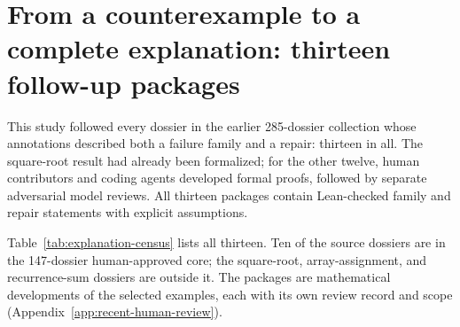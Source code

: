 \section{From a counterexample to a complete explanation: thirteen follow-up packages}
\label{app:explanation-census}

This study followed every dossier in the earlier 285-dossier collection whose annotations described both a failure family and a repair: thirteen in all. The square-root result had already been formalized; for the other twelve, human contributors and coding agents developed formal proofs, followed by separate adversarial model reviews. All thirteen packages contain Lean-checked family and repair statements with explicit assumptions.

Table~\ref{tab:explanation-census} lists all thirteen. Ten of the source dossiers are in the 147-dossier human-approved core; the square-root, array-assignment, and recurrence-sum dossiers are outside it. The packages are mathematical developments of the selected examples, each with its own review record and scope (Appendix~\ref{app:recent-human-review}).

